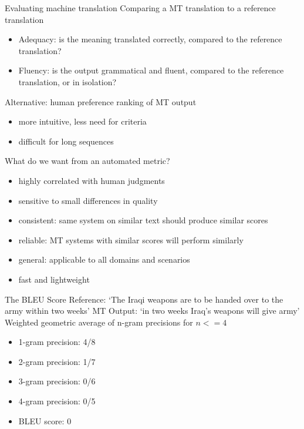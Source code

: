\begin{vbframe}{Evaluating machine translation}
	Comparing a MT translation to a reference translation
	\begin{itemize}
		\item Adequacy: is the meaning translated correctly, compared to the reference translation?
		\item Fluency: is the output grammatical and fluent, compared to the reference translation, or in isolation?
	\end{itemize}
	\vfill
	Alternative: human preference ranking of MT output
	\begin{itemize}
		\item more intuitive, less need for criteria
		\item difficult for long sequences
	\end{itemize}
\end{vbframe}

\begin{vbframe}{What do we want from an automated metric?}
	\vfill
	\begin{itemize}
		\item highly correlated with human judgments
		\item sensitive to small differences in quality
		\item consistent: same system on similar text should produce similar scores
		\item reliable: MT systems with similar scores will perform similarly
		\item general: applicable to all domains and scenarios
		\item fast and lightweight
	\end{itemize}
\end{vbframe}

\begin{vbframe}{The BLEU Score}
	Reference: `The Iraqi weapons are to be handed over to the army within two weeks'
	\vfill
	MT Output: `in two weeks Iraq's weapons will give army'
	\vfill
	Weighted geometric average of n-gram precisions for $n<=4$
	\begin{itemize}
		\item 1-gram precision: 4/8
		\item 2-gram precision: 1/7
		\item 3-gram precision: 0/6
		\item 4-gram precision: 0/5
		\item BLEU score: 0
	\end{itemize}
\end{vbframe}

